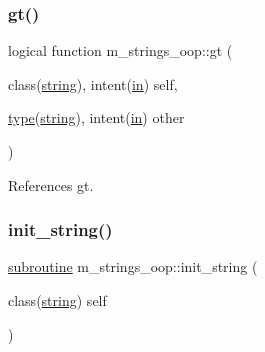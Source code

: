 \mbox{\label{namespacem__strings__oop_a25beb184587d7c9fc0a3fd846d4ce187}} 
\subsubsection{\texorpdfstring{gt()}{gt()}}
{\footnotesize\ttfamily logical function m\+\_\+strings\+\_\+oop\+::gt (\begin{DoxyParamCaption}\item[{class(\hyperlink{structm__strings__oop_1_1string}{string}), intent(\hyperlink{M__journal_83_8txt_afce72651d1eed785a2132bee863b2f38}{in})}]{self,  }\item[{\hyperlink{stop__watch_83_8txt_a70f0ead91c32e25323c03265aa302c1c}{type}(\hyperlink{structm__strings__oop_1_1string}{string}), intent(\hyperlink{M__journal_83_8txt_afce72651d1eed785a2132bee863b2f38}{in})}]{other }\end{DoxyParamCaption})\hspace{0.3cm}{\ttfamily [private]}}



References gt.

\mbox{\label{namespacem__strings__oop_a1510c1de10cb182598ce6a399a734be0}} 
\subsubsection{\texorpdfstring{init\+\_\+string()}{init\_string()}}
{\footnotesize\ttfamily \hyperlink{M__stopwatch_83_8txt_acfbcff50169d691ff02d4a123ed70482}{subroutine} m\+\_\+strings\+\_\+oop\+::init\+\_\+string (\begin{DoxyParamCaption}\item[{class(\hyperlink{structm__strings__oop_1_1string}{string})}]{self }\end{DoxyParamCaption})\hspace{0.3cm}{\ttfamily [private]}}

\mbox{\label{namespacem__strings__oop_a103e7c1fab92a1c4cbfff87ec8cd1e23}} 
